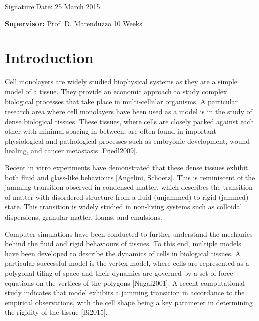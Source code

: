 \documentclass[a4paper,12pt]{article}
\begin{document}
\vspace*{2cm}
Signature:\hspace*{8cm}Date: 25 March 2015

\vfill
{\bf Supervisor:} Prof. D. Marenduzzo                 %
\hfill
10 Weeks                                         %
\newpage
%
\pagestyle{plain}                               %
\setcounter{page}{1}                            %
\tableofcontents                                %

\break
\section{Introduction}
Cell monolayers are widely studied biophysical systems as they are a simple model of a tissue. They provide an economic approach to study complex biological processes that take place in multi-cellular organisms. A particular research area where cell monolayers have been used as a model is in the study of dense biological tissues. These tissues, where cells are closely packed against each other with minimal spacing in between, are often found in important physiological and pathological processes such as embryonic development, wound healing, and cancer metastasis [Friedl2009].  

Recent in vitro experiments have demonstrated that these dense tissues exhibit both fluid and glass-like behaviours [Angelini, Schoetz]. This is reminiscent of the jamming transition observed in condensed matter, which describes the transition of matter with disordered structure from a fluid (unjammed) to rigid (jammed) state. This transition is widely studied in non-living systems such as colloidal dispersions, granular matter, foams, and emulsions. 

Computer simulations have been conducted to further understand the mechanics behind the fluid and rigid behaviours of tissues. To this end, multiple models have been developed to describe the dynamics of cells in biological tissues. A particular successful model is the vertex model, where cells are represented as a polygonal tiling of space and their dynamics are governed by a set of force equations on the vertices of the polygons [Nagai2001]. A recent computational study indicates that model exhibits a jamming transition in accordance to the empirical observations, with the cell shape being a key parameter in determining the rigidity of the tissue [Bi2015].
\end{document}

